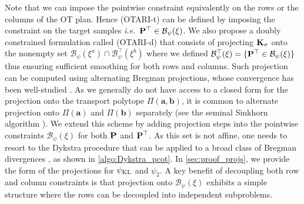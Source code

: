 Note that we can impose the pointwise constraint equivalently on the rows or the columns of the OT plan. Hence (OTARI-t) can be defined by imposing the constraint on the target samples \textit{i.e.}\ ${\mathbf{P}}^\top \in \mathcal{B}_\psi(\xi)$.
We also propose a doubly constrained formulation called (OTARI-d) that consists of projecting ${\mathbf{K}}_\sigma$ onto the nonempty set $\mathcal{B}_\psi(\xi^{a}) \cap \mathcal{B}^\top_\psi(\xi^b)$ 
where we defined $\mathcal{B}^\top_\psi(\xi) = \{ {\mathbf{P}}^\top \in \mathcal{B}_\psi(\xi)\}$ thus ensuring sufficient smoothing for both rows and columns.
Such projection can be computed using alternating Bregman projections, whose convergence has been well-studied \citep{censor1998dykstra, benamou2015iterative}.
As we generally do not have access to a closed form for the projection onto the transport polytope $\Pi(\bm{a}, \bm{b})$, it is common to alternate projection onto $\Pi(\bm{a})$ and $\Pi(\bm{b})$ separately (see \eg the seminal Sinkhorn algorithm \citep{cuturi2013sinkhorn}).
We extend this scheme by adding projection steps into the pointwise constraints $\mathcal{B}_\psi(\xi)$ for both ${\mathbf{P}}$ and ${\mathbf{P}}^\top$. As this set is not affine, one needs to resort to the Dykstra procedure \citep{dykstra1983algorithm} that can be applied to a broad class of Bregman divergences \citep{bauschke2000dykstras}, as shown in \cref{algo:Dykstra_pcot}.
In \cref{sec:proof_projs}, we provide the form of the projections for $\psi_{\operatorname{KL}}$ and $\psi_2$. A key benefit of decoupling both row and column constraints is that projection onto $\mathcal{B}_{\psi}(\xi)$ exhibits a simple structure where the rows can be decoupled into independent subproblems.
